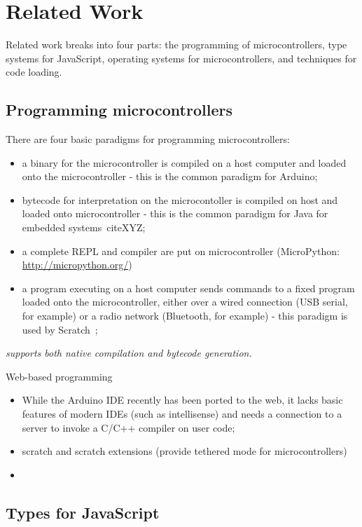 \section{Related Work}
\label{sec:related}

Related work breaks into four parts: the programming of microcontrollers, 
type systems for JavaScript, operating systems
for microcontrollers, and techniques for code loading.

\subsection{Programming microcontrollers}

There are four basic paradigms for programming microcontrollers:
\begin{itemize}
\item a binary for the microcontroller is compiled on a host computer and loaded onto the microcontroller -
this is the common paradigm for Arduino;
\item bytecode for interpretation on the microcontoller is compiled on host and loaded onto microcontroller - 
this is the common paradigm for Java for embedded systems~cite{XYZ};
\item a complete REPL and compiler are put on microcontroller (MicroPython: \url{http://micropython.org/})
\item a program executing on a host computer sends commands to a fixed program loaded onto the
microcontroller, either over a wired connection (USB serial, for example) or a radio network
(Bluetooth, for example) - this paradigm is used by Scratch~\cite{};
\end{itemize}

\emph{\MC supports both native compilation and bytecode generation.}


Web-based programming

\begin{itemize}
\item While the Arduino IDE recently 
has been ported to the web, it lacks basic features of modern IDEs (such as intellisense) 
and needs a connection to a server to invoke a C/C++ compiler on user code;
\item scratch and scratch extensions (provide tethered mode for microcontrollers)
\item 
\end{itemize}

\subsection{Types for JavaScript}

